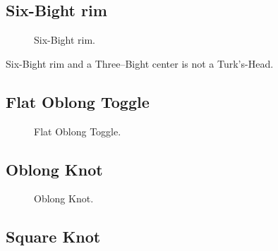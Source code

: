 \subsection{Six-Bight rim}

\begin{figure}[H]\centering
	\begin{minipage}{1\linewidth}
		\begin{center}
			\tcbox[enhanced jigsaw,colframe=black,opacityframe=0.5,opacityback=0.5]
			{\centering{}}
		\end{center}
	\end{minipage}
\caption{Six-Bight rim.}
\label{ris:Six-Bight_rim}
\end{figure}

Six-Bight rim and a Three–Bight center is not a Turk’s-Head.

\subsection{Flat Oblong Toggle}

\begin{figure}[H]\centering
	\begin{minipage}{1\linewidth}
		\begin{center}
			\tcbox[enhanced jigsaw,colframe=black,opacityframe=0.5,opacityback=0.5]
			{\centering{}}
		\end{center}
	\end{minipage}
\caption{Flat Oblong Toggle.}
\label{ris:Flat_Oblong_Toggle}
\end{figure}

\subsection{Oblong Knot}

\begin{figure}[H]\centering
	\begin{minipage}{1\linewidth}
		\begin{center}
			\tcbox[enhanced jigsaw,colframe=black,opacityframe=0.5,opacityback=0.5]
			{\centering{}}
		\end{center}
	\end{minipage}
\caption{Oblong Knot.}
\label{ris:Oblong_Knot}
\end{figure}

\subsection{Square Knot}

